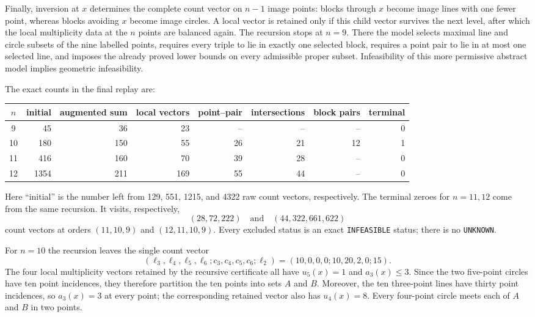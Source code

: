 \documentclass[11pt,a4paper]{article}
\theoremstyle{definition}
\begin{document}
Finally, inversion at $x$ determines the complete count vector on $n-1$ image
points: blocks through $x$ become image lines with one fewer point, whereas
blocks avoiding $x$ become image circles.  A local vector is retained only if this
child vector survives the next level, after which the local multiplicity data
at the $n$ points are balanced again.  The recursion stops at $n=9$.  There the model
selects maximal line and circle subsets of the nine labelled points, requires
every triple to lie in exactly one selected block, requires a point pair to
lie in at most one selected line, and imposes the already proved lower bounds
on every admissible proper subset.  Infeasibility of this more permissive
abstract model implies geometric infeasibility.

The exact counts in the final replay are:
\begin{center}
\small
\begin{tabular}{c|rrrrrrr}
\toprule
$n$ & initial & augmented sum & local vectors & point--pair & intersections & block pairs & terminal\\
\midrule
9  &45   &36  &23  &-- &-- &-- &0\\
10 &180  &150 &55  &26 &21 &12 &1\\
11 &416  &160 &70  &39 &28 &-- &0\\
12 &1354 &211 &169 &55 &44 &-- &0\\
\bottomrule
\end{tabular}
\end{center}
Here ``initial'' is the number left from 129, 551, 1215, and 4322 raw
count vectors, respectively.  The terminal zeroes for $n=11,12$ come from the
same recursion.  It visits, respectively,
\[
 (28,72,222)\quad\text{and}\quad(44,322,661,622)
\]
count vectors at orders $(11,10,9)$ and $(12,11,10,9)$.  Every excluded status
is an exact \texttt{INFEASIBLE} status; there is no \texttt{UNKNOWN}.

For $n=10$ the recursion leaves the single count vector
\[
 (\ell_3,\ell_4,\ell_5,\ell_6;
   c_3,c_4,c_5,c_6;\ell_2)
 =(10,0,0,0;10,20,2,0;15).
\]
The four local multiplicity vectors retained by the recursive certificate all have
$u_5(x)=1$ and $a_3(x)\le3$.  Since the two five-point circles have ten point
incidences, they therefore partition the ten points into sets $A$ and $B$.
Moreover, the ten three-point lines have thirty point incidences, so
$a_3(x)=3$ at every point; the corresponding retained vector also has
$u_4(x)=8$.  Every four-point circle meets each of $A$ and $B$ in two points.
\end{document}
